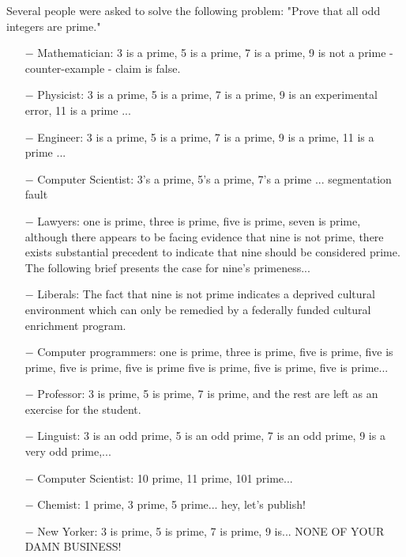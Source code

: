 Several people were asked to solve the following problem: "Prove that all odd integers are prime."

\begin{itemize}	 
	\item[$-$] Mathematician: 3 is a prime, 5 is a prime, 7 is a prime, 9 is not a prime - counter-example - claim is false.

	\item[$-$] Physicist: 3 is a prime, 5 is a prime, 7 is a prime, 9 is an experimental error, 11 is a prime ...

	\item[$-$] Engineer: 3 is a prime, 5 is a prime, 7 is a prime, 9 is a prime, 11 is a prime ...

	\item[$-$] Computer Scientist: 3's a prime, 5's a prime, 7's a prime ... segmentation fault

	\item[$-$] Lawyers: one is prime, three is prime, five is prime, seven is prime, although there appears to be facing evidence that nine is not prime, there exists substantial precedent to indicate that nine should be considered prime. The following brief presents the case for nine's primeness...

	\item[$-$] Liberals: The fact that nine is not prime indicates a deprived cultural environment which can only be remedied by a federally funded cultural enrichment program.

	\item[$-$] Computer programmers: one is prime, three is prime, five is prime, five is prime, five is prime, five is prime five is prime, five is prime, five is prime...

	\item[$-$] Professor: 3 is prime, 5 is prime, 7 is prime, and the rest are left as an exercise for the student.

	\item[$-$] Linguist: 3 is an odd prime, 5 is an odd prime, 7 is an odd prime, 9 is a very odd prime,...

	\item[$-$] Computer Scientist: 10 prime, 11 prime, 101 prime...

	\item[$-$] Chemist: 1 prime, 3 prime, 5 prime... hey, let's publish!

	\item[$-$] New Yorker: 3 is prime, 5 is prime, 7 is prime, 9 is... NONE OF YOUR DAMN BUSINESS!


\end{itemize}
